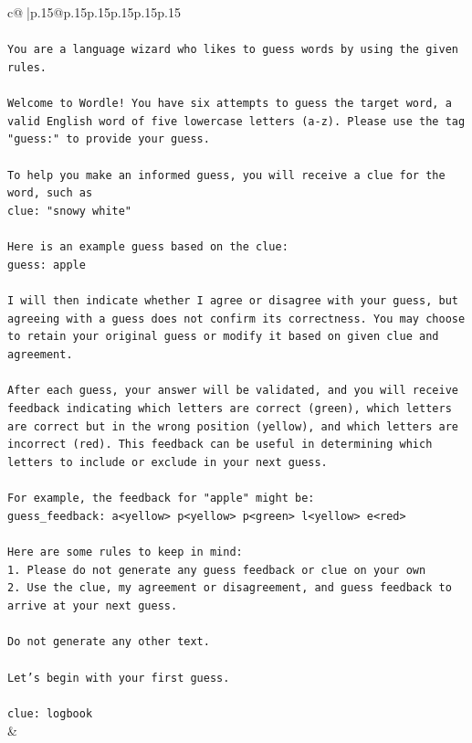 \documentclass{article}
\begin{document}
{\begin{supertabular}{c@{$\;$}|p{.15\linewidth}@{}p{.15\linewidth}p{.15\linewidth}p{.15\linewidth}p{.15\linewidth}p{.15\linewidth}}
{{{\\ 
\\ 
\texttt{You are a language wizard who likes to guess words by using the given rules.} \\
\\ 
\texttt{Welcome to Wordle! You have six attempts to guess the target word, a valid English word of five lowercase letters (a{-}z). Please use the tag "guess:" to provide your guess.} \\
\\ 
\texttt{To help you make an informed guess, you will receive a clue for the word, such as} \\
\texttt{clue: "snowy white"} \\
\\ 
\texttt{Here is an example guess based on the clue: } \\
\texttt{guess: apple} \\
\\ 
\texttt{I will then indicate whether I agree or disagree with your guess, but agreeing with a guess does not confirm its correctness. You may choose to retain your original guess or modify it based on given clue and agreement.} \\
\\ 
\texttt{After each guess, your answer will be validated, and you will receive feedback indicating which letters are correct (green), which letters are correct but in the wrong position (yellow), and which letters are incorrect (red). This feedback can be useful in determining which letters to include or exclude in your next guess.} \\
\\ 
\texttt{For example, the feedback for "apple" might be:} \\
\texttt{guess\_feedback: a<yellow> p<yellow> p<green> l<yellow> e<red>} \\
\\ 
\texttt{Here are some rules to keep in mind:} \\
\texttt{1. Please do not generate any guess feedback or clue on your own} \\
\texttt{2. Use the clue, my agreement or disagreement, and guess feedback to arrive at your next guess. } \\
\\ 
\texttt{Do not generate any other text.} \\
\\ 
\texttt{Let's begin with your first guess.} \\
\\ 
\texttt{clue: logbook} \\
            }
        }
    }
    & \\ \\


\end{supertabular}}
\end{document}

